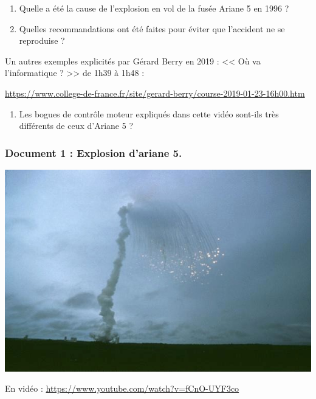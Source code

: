 \documentclass[a4paper,10pt]{report}
\theoremstyle{exo}
\theoremstyle{exercice}
\begin{document}
\begin{enumerate}
    \item Quelle a été la cause de l'explosion en vol de la fusée Ariane 5 en 1996 ?
    
    \medskip\dotfill
    
    \medskip\dotfill
    
    \item Quelles recommandations ont été faites pour éviter que l'accident ne se reproduise ?
    
    \medskip\dotfill
    
    \medskip\dotfill
\end{enumerate}

Un autres exemples explicités par Gérard Berry en 2019 : << Où va l'informatique ? >> de 1h39 à 1h48 :

\href{https://www.college-de-france.fr/site/gerard-berry/course-2019-01-23-16h00.htm}{https://www.college-de-france.fr/site/gerard-berry/course-2019-01-23-16h00.htm}

\begin{enumerate}[resume]
    \item Les bogues de contrôle moteur expliqués dans cette vidéo sont-ils très différents de ceux d'Ariane 5 ?
    
    \medskip\dotfill
    
    \medskip\dotfill
\end{enumerate}
\subsubsection{Document 1 : Explosion d'ariane 5.}

\begin{center}
\includegraphics[scale=0.6]{image/ariane-v501-4juin96.jpg}

En vidéo : \href{https://www.youtube.com/watch?v=fCnO-UYF3co}{https://www.youtube.com/watch?v=fCnO-UYF3co}
\end{center}
\end{document}

